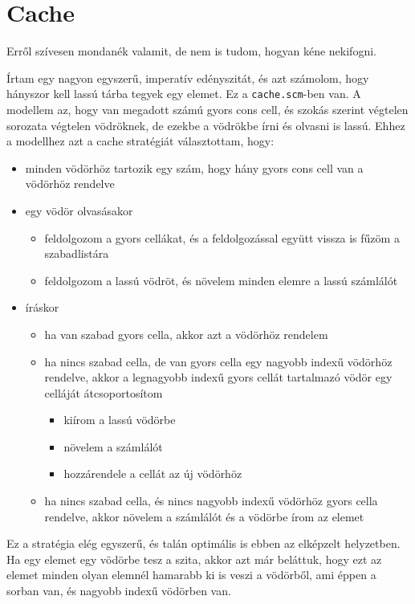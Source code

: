 \documentclass{article}
\begin{document}
\section{Cache}

Erről szívesen mondanék valamit, de nem is tudom, hogyan kéne nekifogni.

Írtam egy nagyon egyszerű, imperatív edényszitát, és azt számolom, hogy hányszor kell lassú tárba tegyek egy elemet.
Ez a \texttt{cache.scm}-ben van.
A modellem az, hogy van megadott számú gyors cons cell, és szokás szerint végtelen sorozata végtelen vödröknek, de ezekbe a vödrökbe írni és olvasni is lassú.
Ehhez a modellhez azt a cache stratégiát választottam, hogy:
\begin{itemize}
\item minden vödörhöz tartozik egy szám, hogy hány gyors cons cell van a vödörhöz rendelve
\item egy vödör olvasásakor
\begin{itemize}
\item feldolgozom a gyors cellákat, és a feldolgozással együtt vissza is fűzöm a szabadlistára
\item feldolgozom a lassú vödröt, és növelem minden elemre a lassú számlálót
\end{itemize}
\item íráskor
\begin{itemize}
\item ha van szabad gyors cella, akkor azt a vödörhöz rendelem
\item ha nincs szabad cella, de van gyors cella egy nagyobb indexű vödörhöz rendelve, akkor a legnagyobb indexű gyors cellát tartalmazó vödör egy celláját átcsoportosítom
\begin{itemize}
\item kiírom a lassú vödörbe
\item növelem a számlálót
\item hozzárendele a cellát az új vödörhöz
\end{itemize}
\item ha nincs szabad cella, és nincs nagyobb indexű vödörhöz gyors cella rendelve, akkor növelem a számlálót és a vödörbe írom az elemet
\end{itemize}
\end{itemize}

Ez a stratégia elég egyszerű, és talán optimális is ebben az elképzelt helyzetben.
Ha egy elemet egy vödörbe tesz a szita, akkor azt már beláttuk, hogy ezt az elemet minden olyan elemnél hamarabb ki is veszi a vödörből, ami éppen a sorban van, és nagyobb indexű vödörben van.
\end{document}
